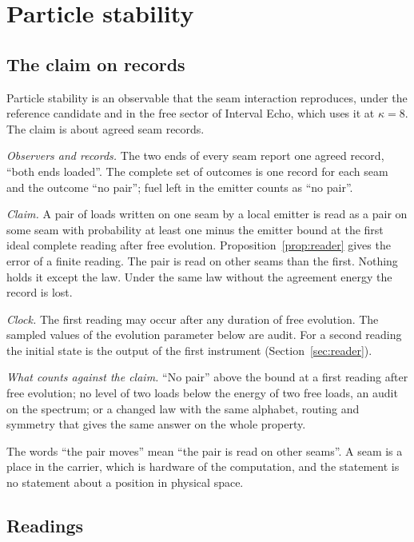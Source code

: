 \documentclass[11pt]{article}
\theoremstyle{definition}
\theoremstyle{remark}
\theoremstyle{plain}
\begin{document}
\section{Particle stability}
\label{sec:stability}

\subsection{The claim on records}

Particle stability is an observable that the seam interaction reproduces,
under the reference candidate and in the free sector of Interval Echo,
which uses it at $\kappa=8$. The claim is about agreed seam records.

\emph{Observers and records.} The two ends of every seam report one agreed
record, ``both ends loaded''. The complete set of outcomes is
one record for each seam and the outcome ``no pair''; fuel left in the
emitter counts as ``no pair''.

\emph{Claim.} A pair of loads written on one seam by a local emitter is read
as a pair on some seam with probability at least one minus the emitter
bound at the first ideal complete reading after free evolution.
Proposition~\ref{prop:reader} gives the error of a finite reading.
The pair is read on other seams than the first.
Nothing holds it except the law. Under the same law without the agreement
energy the record is lost.

\emph{Clock.} The first reading may occur after any duration of free
evolution. The sampled values of the evolution parameter below are audit.
For a second reading the initial state is the output of the first instrument
(Section~\ref{sec:reader}).

\emph{What counts against the claim.} ``No pair'' above the bound at a
first reading after free evolution; no level of two loads below the energy of two free loads, an
audit on the spectrum; or a changed law with the same alphabet, routing and
symmetry that gives the same answer on the whole property.

The words ``the pair moves'' mean ``the pair is read on other seams''. A
seam is a place in the carrier, which is hardware of the computation, and
the statement is no statement about a position in physical space.

\subsection{Readings}
\end{document}
